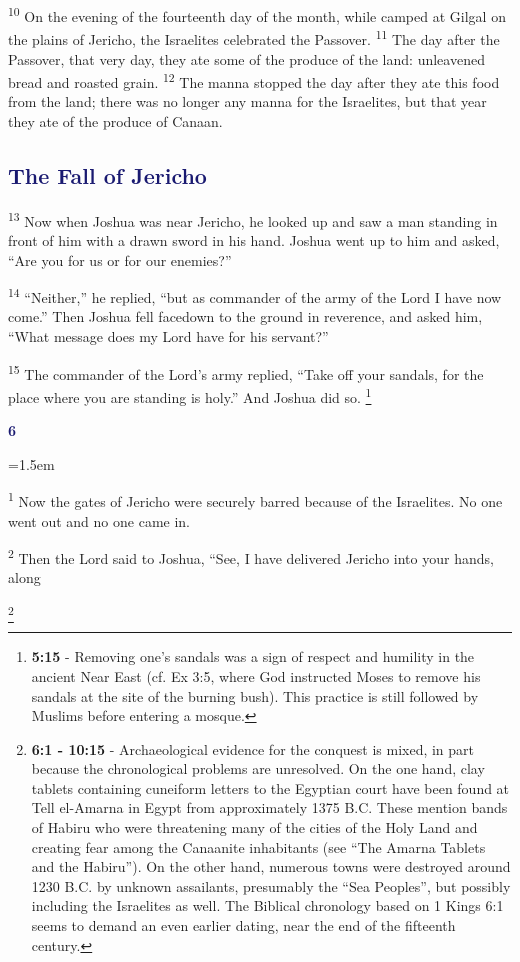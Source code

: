 \documentclass[12pt,twoside]{article}
\newcommand{\vs}[1]{\textsuperscript{#1}}
\newcommand{\vnote}[2]{%
  \begingroup
  \renewcommand\thefootnote{}%
  \footnote{\scriptsize \textbf{}#2}%
  \addtocounter{footnote}{-1}%
  \endgroup
}
\newcommand{\chapterWithIndent}[2]{%
  \noindent
  \begin{minipage}[t]{1cm}
    \vspace{-0.4\baselineskip}
    {\textcolor{MidnightBlue}{\fontsize{40pt}{48pt}\selectfont \textbf{#1}}}
  \end{minipage}%
  \hspace{0.3cm}%
  \begin{minipage}[t]{\dimexpr\linewidth - 1.5cm - 0.3cm\relax}
    \hangindent=1.5em
    \hangafter=3
    #2
    \vspace{0.05cm}
  \end{minipage}
}
\begin{document}
\vs{10} On the evening of the fourteenth day of the month, while camped at Gilgal on the plains of Jericho, the Israelites celebrated the Passover.
\vs{11} The day after the Passover, that very day, they ate some of the produce of the land: unleavened bread and roasted grain.
\vs{12} The manna stopped the day after they ate this food from the land; there was no longer any manna for the Israelites, but that year they ate of the produce of Canaan.

\subsection*{\textcolor{MidnightBlue}{\textbf{The Fall of Jericho}}}

\vs{13} Now when Joshua was near Jericho, he looked up and saw a man standing in front of him with a drawn sword in his hand. Joshua went up to him and asked, ``Are you for us or for our enemies?''

\vs{14} ``Neither,'' he replied, ``but as commander of the army of the Lord I have now come.'' Then Joshua fell facedown to the ground in reverence, and asked him, ``What message does my Lord have for his servant?''

\vs{15} The commander of the Lord's army replied, ``Take off your sandals, for the place where you are standing is holy.'' And Joshua did so.\vnote{15}{\textbf{5:15} - Removing one’s sandals was a sign of respect and humility in the ancient Near East (cf. Ex 3:5, where God instructed
Moses to remove his sandals at the site of the burning bush). This practice is still followed by Muslims before entering a mosque.}

\chapterWithIndent{6}{
  \vs{1} Now the gates of Jericho were securely barred because of the Israelites. No one went out and no one came in.

  \vs{2} Then the Lord said to Joshua, ``See, I have delivered Jericho into your hands, along
}

\vnote{1}{\textbf{6:1 - 10:15} - Archaeological evidence for the conquest is mixed, in part because the chronological problems are unresolved. On the one hand, clay tablets containing cuneiform letters to the Egyptian court have been found at Tell el-Amarna in Egypt from approximately 1375 B.C. These mention bands of Habiru who were threatening many of the cities of the Holy Land and creating fear among the Canaanite inhabitants (see “The Amarna Tablets and the Habiru”). On the other hand, numerous towns were destroyed around 1230 B.C. by unknown assailants, presumably the “Sea Peoples”, but possibly including the Israelites as well. The Biblical chronology based on 1 Kings 6:1 seems to demand an even earlier dating, near the end of the fifteenth century.}
\end{document}
